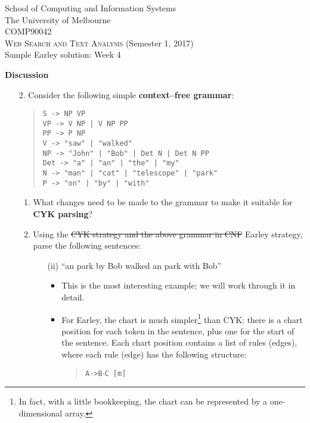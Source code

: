 \documentclass[a4paper]{article}
\begin{document}
\begin{center}
\Large{School of Computing and Information Systems}\\
\Large{The University of Melbourne}\\
\Large{COMP90042}\\
\Large{\textsc{Web Search and Text Analysis} (Semester 1, 2017)}\\[1ex]
\large{Sample Earley solution: Week 4}
\end{center}

\large{\textbf{Discussion}}
\begin{enumerate}
\item [2.] Consider the following simple \textbf{context--free grammar}:
\begin{quote}
\texttt{S -> NP VP}\\
\texttt{VP -> V NP | V NP PP}\\
\texttt{PP -> P NP}\\
\texttt{V -> "saw" | "walked"}\\
\texttt{NP -> "John" | "Bob" | Det N | Det N PP}\\
\texttt{Det -> "a" | "an" | "the" | "my"}\\
\texttt{N -> "man" | "cat" | "telescope" | "park"}\\
\texttt{P -> "on" | "by" | "with"}
\end{quote}
\begin{enumerate}
\item What changes need to be made to the grammar to make it suitable for \textbf{CYK parsing}?
\item Using the \sout{CYK strategy and the above grammar in CNF} Earley strategy, parse the following sentences:
\begin{enumerate}
\item [(ii)] ``an park by Bob walked an park with Bob''
\begin{itemize}
\item This is the most interesting example; we will work through it in detail.
\item For Earley, the chart is much simpler\footnote{In fact, with a little bookkeeping, the chart can be represented by a one-dimensional array.} than CYK: there is a chart position for each token in the sentence, plus one for the start of the sentence. Each chart position contains a list of rules (edges), where each rule (edge) has the following structure:
\begin{quote}
\texttt{A->B}$\cdot$\texttt{C [m]}
\end{quote}

\end{itemize}
\end{enumerate}
\end{enumerate}
\end{enumerate}
\end{document}
